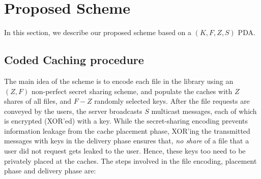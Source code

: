 \documentclass[conference]{IEEEtran}
\begin{document}
\section{Proposed Scheme}\label{sec5}
In this section, we describe our proposed scheme based on a $(K,F,Z,S)$ PDA.
\subsection{Coded Caching procedure}\label{sec5A}
The main idea of the scheme is to encode each file in the library using an $(Z,F)$ non-perfect secret sharing scheme, and populate the caches with $Z$ shares of all files, and $F-Z$ randomly selected keys. After the file requests are conveyed by the users, the server broadcasts $S$ multicast messages, each of which is encrypted (XOR'ed) with a key. While the secret-sharing encoding prevents information leakage from the cache placement phase, XOR'ing the transmitted messages with keys in the delivery phase ensures that, \emph{no share} of a file that a user did not request gets leaked to the user. Hence, these keys too need to be privately placed at the caches. The steps involved in the file encoding, placement phase and delivery phase are:
\end{document}
